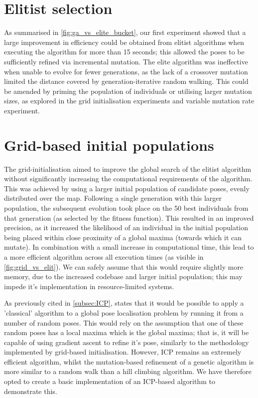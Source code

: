 \documentclass[authoryearcitations]{UoYCSproject}
\begin{document}
\section{Elitist selection}
As summarised in \autoref{fig:ga_vs_elite_bucket}, our first experiment showed that a large improvement in efficiency could be obtained from elitist algorithms when executing the algorithm for more than 15 seconds; this allowed the poses to be sufficiently refined via incremental mutation. The elite algorithm was ineffective when unable to evolve for fewer generations, as the lack of a crossover mutation limited the distance covered by generation-iterative random walking. This could be amended by priming the population of individuals or utilising larger mutation sizes, as explored in the grid initialisation experiments and variable mutation rate experiment.

\section{Grid-based initial populations}
The grid-initialisation aimed to improve the global search of the elitist algorithm without significantly increasing the computational requirements of the algorithm. This was achieved by using a larger initial population of candidate poses, evenly distributed over the map. Following a single generation with this larger population, the subsequent evolution took place on the 50 best individuals from that generation (as selected by the fitness function). This resulted in an improved precision, as it increased the likelihood of an individual in the initial population being placed within close proximity of a global maxima (towards which it can mutate). In combination with a small increase in computational time, this lead to a more efficient algorithm across all execution times (as visible in \autoref{fig:grid_vs_elit}). We can safely assume that this would require slightly more memory, due to the increased codebase and larger initial population; this may impede it's implementation in resource-limited systems. 

As previously cited in \autoref{subsec:ICP}, \citet{Censi2005-iv} states that it would be possible to apply a 'classical' algorithm to a global pose localisation problem by running it from a number of random poses. This would rely on the assumption that one of these random poses has a local maxima which is the global maxima; that is, it will be capable of using gradient ascent to refine it's pose, similarly to the methodology implemented by grid-based initialisation. However, ICP remains an extremely efficient algorithm, whilst the mutation-based refinement of a genetic algorithm is more similar to a random walk than a hill climbing algorithm. We have therefore opted to create a basic implementation of an ICP-based algorithm to demonstrate this.
\end{document}
